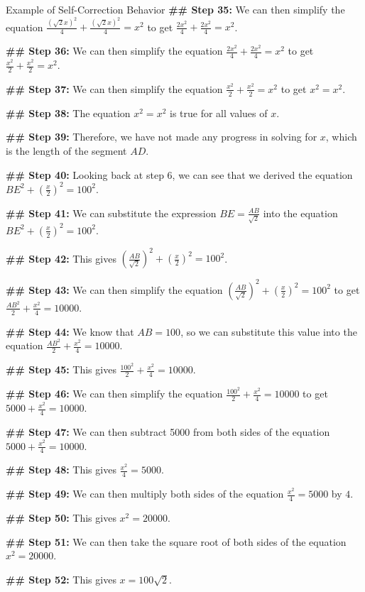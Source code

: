 \begin{promptbox}{Example of Self-Correction Behavior}
\textbf{\#\# Step 35:}
We can then simplify the equation $\frac{(\sqrt{2}x)^2}{4}+\frac{(\sqrt{2}x)^2}{4}=x^2$ to get $\frac{2x^2}{4}+\frac{2x^2}{4}=x^2$.

\textbf{\#\# Step 36:}
We can then simplify the equation $\frac{2x^2}{4}+\frac{2x^2}{4}=x^2$ to get $\frac{x^2}{2}+\frac{x^2}{2}=x^2$.

\textbf{\#\# Step 37:}
We can then simplify the equation $\frac{x^2}{2}+\frac{x^2}{2}=x^2$ to get $x^2=x^2$.

\textbf{\#\# Step 38:}
The equation $x^2=x^2$ is true for all values of $x$.

\textbf{\#\# Step 39:}
Therefore, we have not made any progress in solving for $x$, which is the length of the segment $AD$.

\textbf{\#\# Step 40:}
Looking back at step 6, we can see that we derived the equation $BE^2+\left(\frac{x}{2}\right)^2=100^2$.

\textbf{\#\# Step 41:}
We can substitute the expression $BE=\frac{AB}{\sqrt{2}}$ into the equation $BE^2+\left(\frac{x}{2}\right)^2=100^2$.

\textbf{\#\# Step 42:}
This gives $\left(\frac{AB}{\sqrt{2}}\right)^2+\left(\frac{x}{2}\right)^2=100^2$.

\textbf{\#\# Step 43:}
We can then simplify the equation $\left(\frac{AB}{\sqrt{2}}\right)^2+\left(\frac{x}{2}\right)^2=100^2$ to get $\frac{AB^2}{2}+\frac{x^2}{4}=10000$.

\textbf{\#\# Step 44:}
We know that $AB=100$, so we can substitute this value into the equation $\frac{AB^2}{2}+\frac{x^2}{4}=10000$.

\textbf{\#\# Step 45:}
This gives $\frac{100^2}{2}+\frac{x^2}{4}=10000$.

\textbf{\#\# Step 46:}
We can then simplify the equation $\frac{100^2}{2}+\frac{x^2}{4}=10000$ to get $5000+\frac{x^2}{4}=10000$.

\textbf{\#\# Step 47:}
We can then subtract 5000 from both sides of the equation $5000+\frac{x^2}{4}=10000$.

\textbf{\#\# Step 48:}
This gives $\frac{x^2}{4}=5000$.

\textbf{\#\# Step 49:}
We can then multiply both sides of the equation $\frac{x^2}{4}=5000$ by $4$.

\textbf{\#\# Step 50:}
This gives $x^2=20000$.

\textbf{\#\# Step 51:}
We can then take the square root of both sides of the equation $x^2=20000$.

\textbf{\#\# Step 52:}
This gives $x=100\sqrt{2}$.


\end{promptbox}
